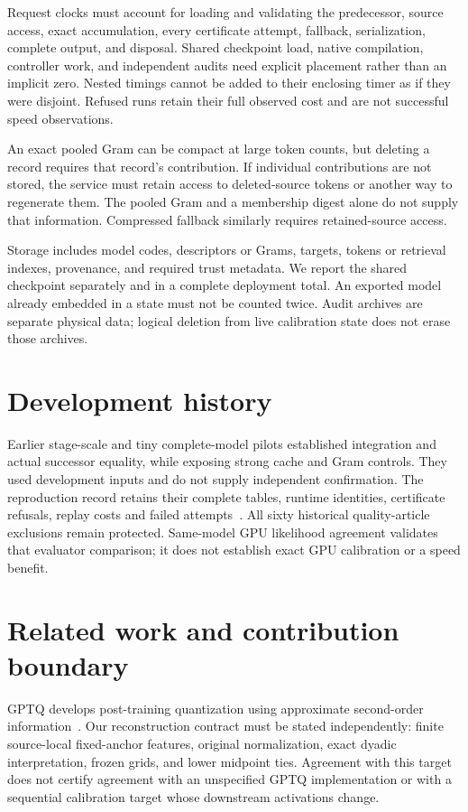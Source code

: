 \documentclass[10pt,twocolumn,letterpaper]{article}
\begin{document}
Request clocks must account for loading and validating the predecessor, source
access, exact accumulation, every certificate attempt, fallback, serialization,
complete output, and disposal. Shared checkpoint load, native compilation,
controller work, and independent audits need explicit placement rather than an
implicit zero. Nested timings cannot be added to their enclosing timer as if they
were disjoint. Refused runs retain their full observed cost and are not successful
speed observations.

An exact pooled Gram can be compact at large token counts, but deleting a record
requires that record's contribution. If individual contributions are not stored,
the service must retain access to deleted-source tokens or another way to
regenerate them. The pooled Gram and a membership digest alone do not supply that
information. Compressed fallback similarly requires retained-source access.

Storage includes model codes, descriptors or Grams, targets, tokens or retrieval
indexes, provenance, and required trust metadata. We report the shared checkpoint
separately and in a complete deployment total. An exported model already embedded
in a state must not be counted twice. Audit archives are separate physical data;
logical deletion from live calibration state does not erase those archives.

\section{Development history}
\label{sec:history}
Earlier stage-scale and tiny complete-model pilots established integration and
actual successor equality, while exposing strong cache and Gram controls.
They used development inputs and do not supply independent confirmation.
The reproduction record retains their complete tables, runtime identities,
certificate refusals, replay costs and failed attempts~\cite{v39,v40,v43,v44,v47}.
All sixty historical quality-article exclusions remain protected. Same-model
GPU likelihood agreement validates that evaluator comparison; it does not
establish exact GPU calibration or a speed benefit.

\section{Related work and contribution boundary}
GPTQ develops post-training quantization using approximate second-order
information~\cite{gptq}. Our reconstruction contract must be stated independently:
finite source-local fixed-anchor features, original normalization, exact dyadic
interpretation, frozen grids, and lower midpoint ties. Agreement with this target
does not certify agreement with an unspecified GPTQ implementation or with a
sequential calibration target whose downstream activations change.
\end{document}
